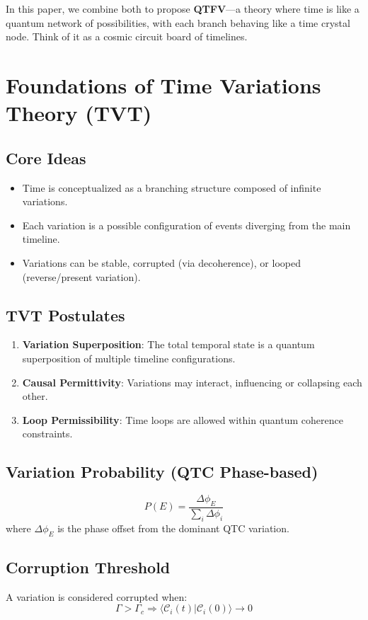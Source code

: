 \documentclass{article}
\theoremstyle{plain}
\theoremstyle{claimstyle}
\begin{document}
In this paper, we combine both to propose \textbf{QTFV}---a theory where time is like a quantum network of possibilities, with each branch behaving like a time crystal node. Think of it as a cosmic circuit board of timelines.

\section{Foundations of Time Variations Theory (TVT)}

\subsection{Core Ideas}
\begin{itemize}
    \item Time is conceptualized as a branching structure composed of infinite variations.
    \item Each variation is a possible configuration of events diverging from the main timeline.
    \item Variations can be stable, corrupted (via decoherence), or looped (reverse/present variation).
\end{itemize}

\subsection{TVT Postulates}
\begin{enumerate}
    \item \textbf{Variation Superposition}: The total temporal state is a quantum superposition of multiple timeline configurations.
    \item \textbf{Causal Permittivity}: Variations may interact, influencing or collapsing each other.
    \item \textbf{Loop Permissibility}: Time loops are allowed within quantum coherence constraints.
\end{enumerate}

\subsection{Variation Probability (QTC Phase-based)}
\begin{equation}
P(E) = \frac{\Delta \phi_E}{\sum_i \Delta \phi_i}
\end{equation}
where \( \Delta \phi_E \) is the phase offset from the dominant QTC variation.

\subsection{Corruption Threshold}
A variation is considered corrupted when:
\begin{equation}
\Gamma > \Gamma_c \Rightarrow \langle \mathcal{C}_i(t)|\mathcal{C}_i(0)\rangle \to 0
\end{equation}
\end{document}
